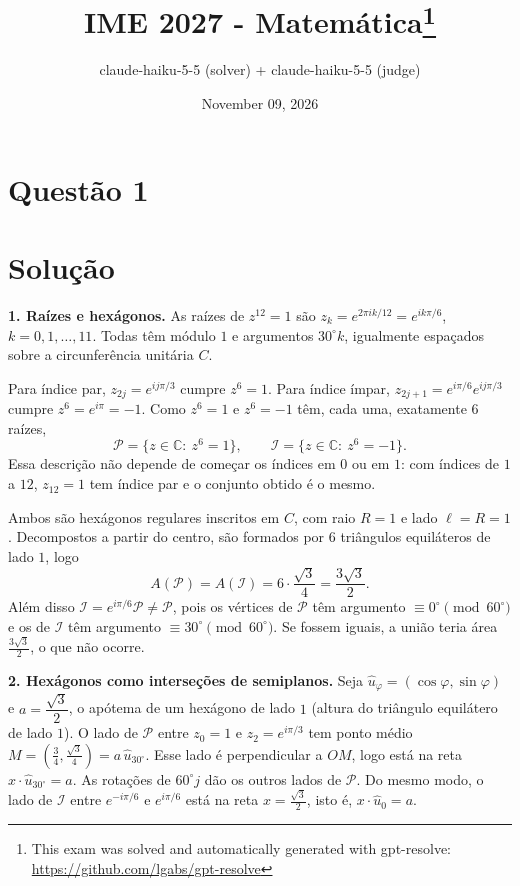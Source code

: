 \documentclass{article}%
\title{IME 2027 - Matemática\thanks{This exam was solved and automatically generated with gpt-resolve: \url{https://github.com/lgabs/gpt-resolve}}}%
\author{claude{-}haiku{-}5{-}5 (solver) + claude{-}haiku{-}5{-}5 (judge)}%
\date{November 09, 2026}%
\begin{document}
%
\normalsize%
\maketitle%
\section*{Questão 1}

\section*{Solução}

\textbf{1. Raízes e hexágonos.} As raízes de $z^{12}=1$ são $z_k=e^{2\pi i k/12}=e^{ik\pi/6}$, $k=0,1,\ldots,11$. Todas têm módulo $1$ e argumentos $30^\circ k$, igualmente espaçados sobre a circunferência unitária $C$.

Para índice par, $z_{2j}=e^{ij\pi/3}$ cumpre $z^6=1$. Para índice ímpar, $z_{2j+1}=e^{i\pi/6}e^{ij\pi/3}$ cumpre $z^6=e^{i\pi}=-1$. Como $z^6=1$ e $z^6=-1$ têm, cada uma, exatamente $6$ raízes,
\[
\mathcal P=\{z\in\mathbb C:\ z^6=1\},\qquad \mathcal I=\{z\in\mathbb C:\ z^6=-1\}.
\]
Essa descrição não depende de começar os índices em $0$ ou em $1$: com índices de $1$ a $12$, $z_{12}=1$ tem índice par e o conjunto obtido é o mesmo.

Ambos são hexágonos regulares inscritos em $C$, com raio $R=1$ e lado $\ell=R=1$. Decompostos a partir do centro, são formados por $6$ triângulos equiláteros de lado $1$, logo
\[
A(\mathcal P)=A(\mathcal I)=6\cdot\frac{\sqrt3}{4}=\frac{3\sqrt3}{2}.
\]
Além disso $\mathcal I=e^{i\pi/6}\mathcal P\neq\mathcal P$, pois os vértices de $\mathcal P$ têm argumento $\equiv 0^\circ \pmod{60^\circ}$ e os de $\mathcal I$ têm argumento $\equiv 30^\circ \pmod{60^\circ}$. Se fossem iguais, a união teria área $\frac{3\sqrt3}{2}$, o que não ocorre.

\textbf{2. Hexágonos como interseções de semiplanos.} Seja $\hat u_\varphi=(\cos\varphi,\sin\varphi)$ e $a=\dfrac{\sqrt3}{2}$, o apótema de um hexágono de lado $1$ (altura do triângulo equilátero de lado $1$). O lado de $\mathcal P$ entre $z_0=1$ e $z_2=e^{i\pi/3}$ tem ponto médio $M=\left(\frac34,\frac{\sqrt3}{4}\right)=a\,\hat u_{30^\circ}$. Esse lado é perpendicular a $OM$, logo está na reta $x\cdot\hat u_{30^\circ}=a$. As rotações de $60^\circ j$ dão os outros lados de $\mathcal P$. Do mesmo modo, o lado de $\mathcal I$ entre $e^{-i\pi/6}$ e $e^{i\pi/6}$ está na reta $x=\frac{\sqrt3}{2}$, isto é, $x\cdot\hat u_0=a$.
\end{document}
